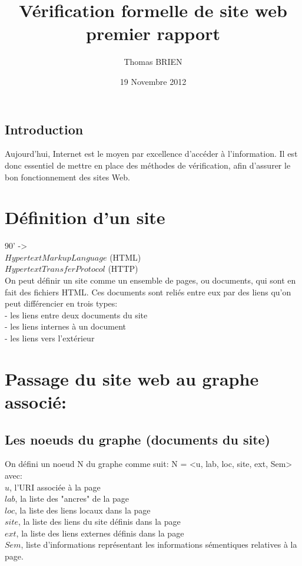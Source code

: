 \documentclass[a4paper]{article}
\title{Vérification formelle de site web\\premier rapport}
\author{Thomas BRIEN}
\date{19 Novembre 2012}
\begin{document}
\maketitle

\subsection*{ Introduction\\ }
Aujourd'hui, Internet est le moyen par excellence d'accéder à l'information. 
Il est donc essentiel de mettre en place des méthodes de vérification, afin d'assurer le bon fonctionnement des sites Web.\\

\section{Définition d'un site\\}
90' -> \\
       $Hypertext Markup Language$ (HTML)\\
       $Hypertext Transfer Protocol$ (HTTP)\\

On peut définir un site comme un ensemble de pages, ou documents, qui sont en fait des fichiers HTML. Ces documents sont reliés entre eux par des liens qu'on peut différencier en trois types:\\
        - les liens entre deux documents du site\\
        - les liens internes à un document\\
        - les liens vers l’extérieur\\

\section{Passage du site web au graphe associé:\\}


\subsection*{ Les noeuds du graphe (documents du site)\\ }
 On défini un noeud N du graphe comme suit: N = <u, lab, loc, site, ext, Sem>\\
 avec:\\
 $u$, l'URI associée à la page\\
 $lab$, la liste des "ancres" de la page\\
 $loc$, la liste des liens locaux dans la page\\
 $site$, la liste des liens du site définis dans la page\\
 $ext$, la liste des liens externes définis dans la page\\
 $Sem$, liste d'informations représentant les informations sémentiques relatives à la page.\\
 
\end{document}
